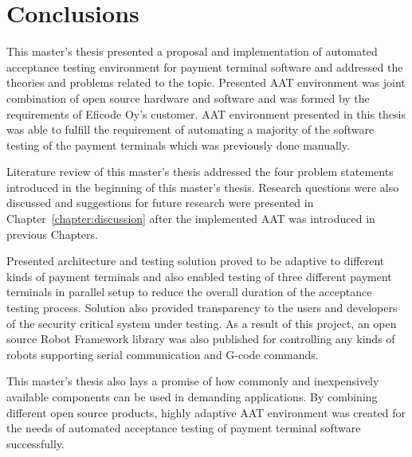 
\chapter{Conclusions}
\label{chapter:conclusions}

This master's thesis presented a proposal and implementation of automated acceptance testing environment for payment terminal software and addressed the theories and problems related to the topic. Presented AAT environment was joint combination of open source hardware and software and was formed by the requirements of Eficode Oy's customer. AAT environment presented in this thesis was able to fulfill the requirement of automating a majority of the software testing of the payment terminals which was previously done manually.

Literature review of this master's thesis addressed the four problem statements introduced in the beginning of this master's thesis. Research questions were also discussed and suggestions for future research were presented in Chapter~\ref{chapter:discussion} after the implemented AAT was introduced in previous Chapters.

Presented architecture and testing solution proved to be adaptive to different kinds of payment terminals and also enabled testing of three different payment terminals in parallel setup to reduce the overall duration of the acceptance testing process. Solution also provided transparency to the users and developers of the security critical system under testing. As a result of this project, an open source Robot Framework library was also published for controlling any kinds of robots supporting serial communication and G-code commands.

This master's thesis also lays a promise of how commonly and inexpensively available components can be used in demanding applications. By combining different open source products, highly adaptive AAT environment was created for the needs of automated acceptance testing of payment terminal software successfully.